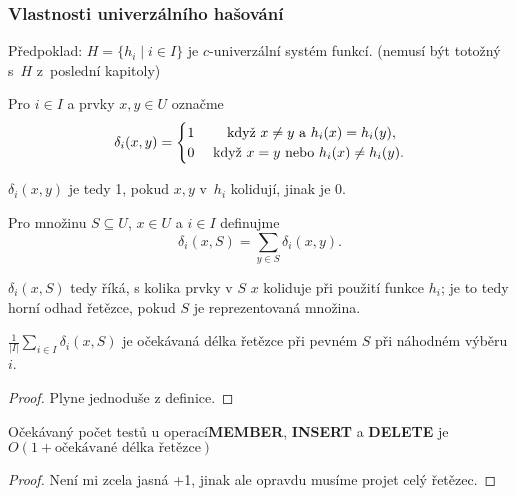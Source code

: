 \documentclass[a4paper,12pt]{article}
\begin{document}
\subsubsection{Vlastnosti univerzálního hašování}
Předpoklad: $H=\{h_i\mid i\in I\}$ je $c$-univerzální systém funkcí. (nemusí být totožný s~$H$ z~poslední kapitoly)

\begin{definice}
     Pro $i\in I$ a prvky $x,y\in U$ 
označme 
$$\delta_i(x,y)=\begin{cases} 1&\quad\text{\rm\ když }x\ne y\text{\rm\ a }
h_i(x)=h_i(y),\\
0&\text{\rm\ když }x=y\text{\rm\ nebo }h_i(x)\ne h_i(y).\end{cases} $$
\end{definice}
$\delta_i(x,y)$ je tedy 1, pokud $x,y$ v~$h_i$ kolidují, jinak je 0.

\begin{definice}
Pro množinu $S\subseteq U$, $x\in U$ a $i\in I$ definujme
$$\delta_i(x,S)=\sum_{y\in S}\delta_i(x,y).$$
\end{definice}
$\delta_i(x,S)$ tedy říká, s kolika prvky v $S$ $x$ koliduje při použití funkce $h_i$; je to tedy horní odhad řetězce, pokud $S$ je reprezentovaná množina.

\begin{lemma}
    $\frac 1{|I|}\sum_{i\in I}\delta_i(x,S)$ je očekávaná délka řetězce při pevném $S$ při náhodném výběru $i$. 
\end{lemma}
\begin{proof}
    Plyne jednoduše z definice.
\end{proof}

\begin{lemma}
    Očekávaný počet testů u operací{\bf MEMBER}, {\bf INSERT} a {\bf DELETE} je $O(1+\mbox{očekávané délka řetězce})$
\end{lemma}
\begin{proof}
    Není mi zcela jasná +1, jinak ale opravdu musíme projet celý řetězec.
\end{proof}
\end{document}
